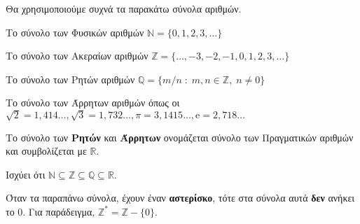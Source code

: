 Θα χρησιμοποιούμε συχνά τα παρακάτω σύνολα αριθμών.
\begin{myitemize}
  \item Το σύνολο των \textcolor{Col1}{Φυσικών} αριθμών 
    $ \mathbb{N} = \{ 0,1,2,3,\ldots \} $
  \item Το σύνολο των \textcolor{Col1}{Ακεραίων} αριθμών 
    $ \mathbb{Z} = \{\ldots,-3,-2,-1, 0,1,2,3,\ldots \} $
  \item Το σύνολο των \textcolor{Col1}{Ρητών} αριθμών $ \mathbb{Q} = 
    \{ m/n \; : \; m,n \in \mathbb{Z}, \; n \neq 0 \} $
  \item Το σύνολο των \textcolor{Col1}{Άρρητων} αριθμών όπως οι 
    $ \sqrt{2} = 1,414\ldots, \sqrt{3} = 1, 732\ldots, \pi = 3,1415\ldots, \mathrm{e} = 
    2,718\ldots $  
  \item Το σύνολο των \textbf{Ρητών} και \textbf{Άρρητων} ονομάζεται σύνολο των
    \textcolor{Col1}{Πραγματικών} αριθμών και συμβολίζεται με $ \mathbb{R} $.
\end{myitemize}
\begin{rem}
  Ισχύει ότι $ \mathbb{N} \subseteq \mathbb{Z} \subseteq\mathbb{Q}\subseteq\mathbb{R} $. 
\end{rem}
\begin{rem}
  Όταν τα παραπάνω σύνολα, έχουν έναν \textbf{αστερίσκο}, τότε στα σύνολα αυτά
  \textbf{δεν} ανήκει το 0. Για παράδειγμα, 
  $ \mathbb{Z}^{*} = \mathbb{Z}- \{ 0 \} $.
\end{rem}


